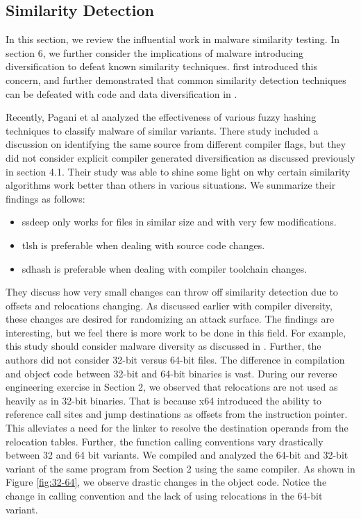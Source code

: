 \documentclass[preprint,12pt]{elsarticle}
\begin{document}
\subsection{Similarity Detection}

In this section, we review the influential work in malware similarity testing. In section 6, we further consider the implications of malware introducing diversification to defeat known similarity techniques. \cite{payer2014embracing} first introduced this concern, and further demonstrated that common similarity detection techniques can be defeated with code and data diversification in \cite{payer2014similarity}.

Recently, Pagani et al \cite{pagani2018beyond} analyzed the effectiveness of various fuzzy hashing techniques to classify malware of similar variants. There study included a discussion on identifying the same source from different compiler flags, but they did not consider explicit compiler generated diversification as discussed previously in section 4.1. Their study was able to shine some light on why certain similarity algorithms work better than others in various situations. We summarize their findings as follows:

\begin{itemize}
  \item ssdeep only works for files in similar size and with very few modifications.
  \item tlsh is preferable when dealing with source code changes.
  \item sdhash is preferable when dealing with compiler toolchain changes.
\end{itemize}

They discuss how very small changes can throw off similarity detection due to offsets and relocations changing. As discussed earlier with compiler diversity, these changes are desired for randomizing an attack surface. The findings are interesting, but we feel there is more work to be done in this field. For example, this study should consider malware diversity as discussed in \cite{payer2014embracing}. Further, the authors did not consider 32-bit versus 64-bit files. The difference in compilation and object code between 32-bit and 64-bit binaries is vast. During our reverse engineering exercise in Section 2, we observed that relocations are not used as heavily as in 32-bit binaries. That is because x64 introduced the ability to reference call sites and jump destinations as offsets from the instruction pointer. This alleviates a need for the linker to resolve the destination operands from the relocation tables. Further, the function calling conventions vary drastically between 32 and 64 bit variants. We compiled and analyzed the 64-bit and 32-bit variant of the same program from Section 2 using the same compiler. As shown in Figure \ref{fig:32-64}, we observe drastic changes in the object code. Notice the change in calling convention and the lack of using relocations in the 64-bit variant. 
\end{document}

